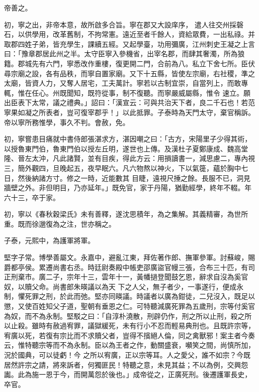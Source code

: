 \begin{pinyinscope}
 帝善之。



 初，寧之出，非帝本意，故所啟多合旨。寧在郡又大設庠序，
 遣人往交州採磬石，以供學用，改革舊制，不拘常憲。遠近至者千餘人，資給眾費，一出私祿。并取郡四姓子弟，皆充學生，課續五經。又起學臺，功用彌廣，江州刺史王凝之上言曰：「豫章郡居此州之半。太守臣寧入參機省，出宰名郡，而肆其奢濁，所為狼籍。郡城先有六門，寧悉改作重樓，復更開二門，合前為八。私立下舍七所。臣伏尋宗廟之設，各有品秩，而寧自置家廟。又下十五縣，皆使左宗廟，右社稷，準之太廟，皆資人力，又奪人居宅，工夫萬計。寧若以古制宜崇，自當列上，而敢專輒，惟在任心。州既聞知，既符從事，制不復聽。而寧嚴威屬縣，惟令
 速立。願出臣表下太常，議之禮典。」詔曰：「漢宣云：可與共治天下者，良二千石也！若范寧果如凝之所表者，豈可復宰郡乎！」以此抵罪。子泰時為天門太守，棄官稱訴。帝以寧所務惟學，事久不判。會赦，免。



 初，寧嘗患目痛就中書侍郎張湛求方，湛因嘲之曰：「古方，宋陽里子少得其術，以授魯東門伯，魯東門伯以授左丘明，遂世也上傳。及漢杜子夏鄭康成、魏高堂隆、晉左太沖，凡此諸賢，並有目疾，得此方云：用損讀書一，減思慮二，專內視三，簡外觀四，旦晚起五，夜早眠六。凡六物熬以神火，下以氣簁，蘊於胸中七日，然後納諸方寸。修之一時，近能數其
 目睫，遠視尺捶之餘。長服不已，洞見牆壁之外。非但明目，乃亦延年。」既免官，家于丹陽，猶勤經學，終年不輟。年六十三，卒于家。



 初，寧以《春秋穀梁氏》未有善釋，遂沈思積年，為之集解。其義精審，為世所重。既而徐邈復為之注，世亦稱之。



 子泰，元熙中，為護軍將軍。



 堅字子常。博學善屬文。永嘉中，避亂江東，拜佐著作郎、撫軍參軍。討蘇峻，賜爵都亭侯。累遷尚書右丞。時廷尉奏殿中帳吏邵廣盜官幔三張，合布三十匹，有司正刑棄市。廣二子，宗年十三，雲年十一，黃幡撾登聞鼓乞恩，辭求自沒為奚官奴，以贖父命。尚書郎朱暎議以為天
 下之人父，無子者少，一事遂行，便成永制，懼死罪之刑，於此而弛。堅亦同暎議。時議者以廣為鉗徒，二兒沒入，既足以懲，又使百姓知父子道，聖朝有垂恩之仁。可特聽減廣死罪為五歲刑，宗等付奚官為奴，而不為永制。堅駁之曰：「自淳朴澆散，刑辟仍作，刑之所以止刑，殺之所以止殺。雖時有赦過宥罪，議獄緩死，未有行小不忍而輕易典刑也。且既許宗等，宥廣以死，若復有宗比而不求贖父者，豈得不擯絕人倫，同之禽獸邪！案主者今奏云，惟特聽宗等而不為永制。臣以為王者之作，動關盛衰，嚬笑之間，尚慎所加，況於國典，可以徒虧！今
 之所以宥廣，正以宗等耳。人之愛父，誰不如宗？今既居然許宗之請，將來訴者，何獨匪民！特聽之意，未見其益；不以為例，交興怨讟。此為施一恩于今，而開萬怨於後也。」成帝從之，正廣死刑。後遷護軍長史，卒官。




\end{pinyinscope}
